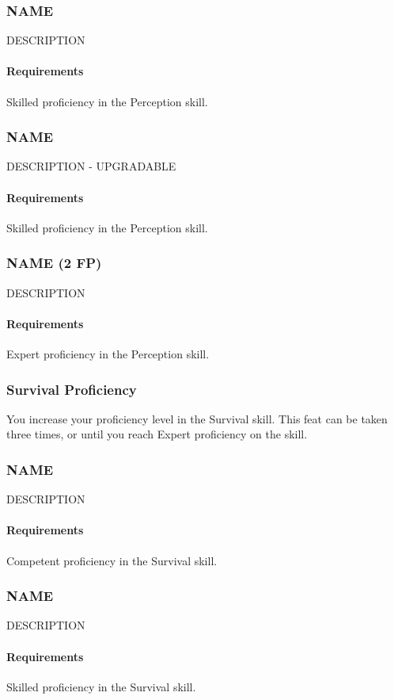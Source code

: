 \subsubsection{NAME} \label{feat::name}
    DESCRIPTION
    \paragraph{Requirements} Skilled proficiency in the Perception skill.
\subsubsection{NAME} \label{feat::name}
    DESCRIPTION - UPGRADABLE
    \paragraph{Requirements} Skilled proficiency in the Perception skill.
\subsubsection{NAME (2 FP)} \label{feat::name}
    DESCRIPTION
    \paragraph{Requirements} Expert proficiency in the Perception skill.
\subsubsection{Survival Proficiency} \label{feat::survivalprof}
    You increase your proficiency level in the Survival skill.
    This feat can be taken three times, or until you reach Expert proficiency on the skill.
\subsubsection{NAME} \label{feat::name}
    DESCRIPTION
    \paragraph{Requirements} Competent proficiency in the Survival skill.
\subsubsection{NAME} \label{feat::name}
    DESCRIPTION
    \paragraph{Requirements} Skilled proficiency in the Survival skill.
